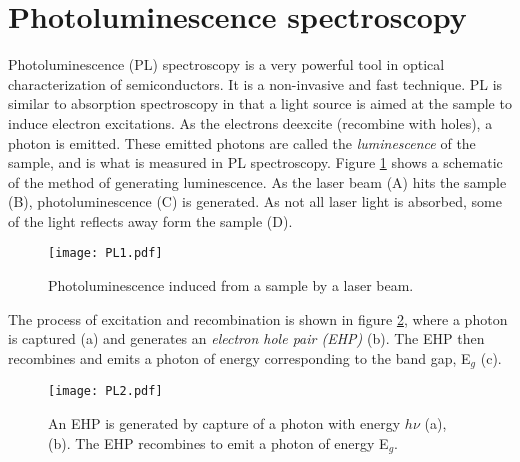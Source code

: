 			
			
		

	
\section{Photoluminescence spectroscopy}
\label{sec:pl}
Photoluminescence (PL) spectroscopy is a very powerful tool in optical characterization of semiconductors. It is a non-invasive and fast technique. PL is similar to absorption spectroscopy in that a light source is aimed at the sample to induce electron excitations. As the electrons deexcite (recombine with holes), a photon is emitted. These emitted photons are called the \emph{luminescence} of the sample, and is what is measured in PL spectroscopy. Figure \ref{fig:pl1} shows a schematic of the method of generating luminescence. As the laser beam (A) hits the sample (B), photoluminescence (C) is generated. As not all laser light is absorbed, some of the light reflects away form the sample (D). 

\begin{figure}[h]
\begin{center}
\texttt{[image: PL1.pdf]}
\caption{Photoluminescence induced from a sample by a laser beam. 
\label{fig:pl1}}
\end{center}
\end{figure}

The process of excitation and recombination is shown in figure \ref{fig:pl2}, where a photon is captured (a) and generates an \emph{electron hole pair (EHP)} (b). The EHP then recombines and emits a photon of energy corresponding to the band gap, E$_g$ (c). 

\begin{figure}[h]
\begin{center}
\texttt{[image: PL2.pdf]}
\caption{An EHP is generated by capture of a photon with energy $h\nu$ (a), (b). The EHP recombines to emit a photon of energy E$_g$.
\label{fig:pl2}}
\end{center}
\end{figure}

